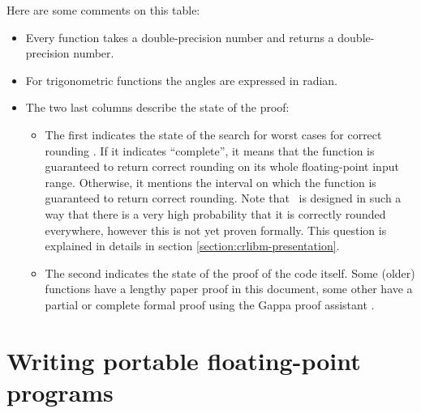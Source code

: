 Here are some comments on this table:
\begin{itemize}
\item Every function takes a double-precision number and returns a
  double-precision number.
\item For trigonometric functions the angles are
  expressed in radian.
\item The two last columns describe the state of the
  proof:
  \begin{itemize}
  \item The first indicates the state of the search for worst cases
    for correct rounding \cite{LMT98,Lef2000}. If it indicates
    ``complete'', it means that the function is guaranteed to return
    correct rounding on its whole floating-point input range.
    Otherwise, it mentions the interval on which the function is
    guaranteed to return correct rounding. Note that \crlibm\ is
    designed in such a way that there is a very high probability that it
    is correctly rounded everywhere, however this is not yet proven
    formally. This question is explained in details in section
    \ref{section:crlibm-presentation}.

  \item The second indicates the state of the proof of the code
    itself. Some (older) functions have a lengthy paper proof in this
    document, some other have a partial or complete formal proof using
    the Gappa proof assistant \cite{Melqu05,DinLauMel2005}.
  \end{itemize}
\end{itemize}


\section{Writing portable floating-point programs}

